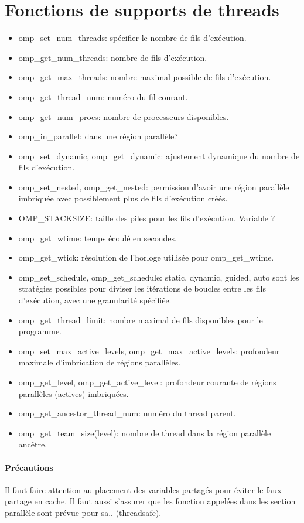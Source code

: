 \documentclass[oneside]{book}
\begin{document}
\section{Fonctions de supports de threads}
\begin{itemize}
\item omp\_set\_num\_threads: spécifier le nombre de fils
d'exécution.
\item omp\_get\_num\_threads: nombre de fils d'exécution.
\item omp\_get\_max\_threads: nombre maximal possible de fils
d'exécution.
\item omp\_get\_thread\_num: numéro du fil courant.
\item omp\_get\_num\_procs: nombre de processeurs disponibles.
\item omp\_in\_parallel: dans une région parallèle?
\item omp\_set\_dynamic, omp\_get\_dynamic: ajustement
dynamique du nombre de fils d'exécution.
\item omp\_set\_nested, omp\_get\_nested: permission d'avoir une
région parallèle imbriquée avec possiblement plus de fils
d'exécution créés.
\item OMP\_STACKSIZE: taille des piles pour les fils d'exécution. Variable ?
\item omp\_get\_wtime: temps écoulé en secondes.
\item omp\_get\_wtick: résolution de l'horloge utilisée pour
omp\_get\_wtime.
\item omp\_set\_schedule, omp\_get\_schedule: static, dynamic, guided, auto sont les
stratégies possibles pour diviser les itérations de boucles entre les fils
d'exécution, avec une granularité spécifiée.
\item omp\_get\_thread\_limit: nombre maximal de fils disponibles pour le programme.
\item omp\_set\_max\_active\_levels, omp\_get\_max\_active\_levels: profondeur
maximale d'imbrication de régions parallèles.
\item omp\_get\_level, omp\_get\_active\_level: profondeur courante de régions
parallèles (actives) imbriquées.
\item omp\_get\_ancestor\_thread\_num: numéro du thread parent.
\item omp\_get\_team\_size(level): nombre de thread dans la région parallèle ancêtre.
\end{itemize}

\paragraph{Précautions}
Il faut faire attention au placement des variables partagés pour éviter le faux partage en cache. Il faut aussi s'assurer que les fonction appelées dans les section parallèle sont prévue pour sa.. (threadsafe).\\
\end{document}
